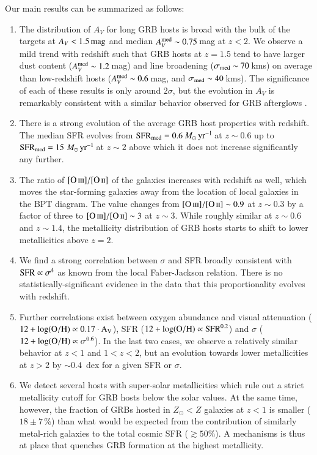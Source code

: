 \documentclass[traditabstract, longauth]{aa}
\newcommand{\oh}{12+\log(\rm{O/H})}
\newcommand{\oii}{[\ion{O}{ii}]}
\newcommand{\oiii}{[\ion{O}{iii}]}
\newcommand{\Msunyr}{$M_\odot\,\rm{yr}^{-1}$}
\begin{document}
Our main results can be summarized as follows:
\begin{enumerate}
\item The distribution of $A_V$ for long GRB hosts is broad with the bulk of the targets at $A_V<1.5\,\rm{mag}$ and median $A_V^{\rm med} \sim 0.75$\,mag at $z<2$. We observe a mild trend with redshift such that GRB hosts at $z = 1.5$ tend to have larger dust content ($A_V^{\rm med} \sim 1.2$\,mag) and line broadening ($\sigma_{\rm{med}}\sim70$\,kms) on average than low-redshift hosts ($A_V^{\rm med} \sim 0.6$\,mag, and $\sigma_{\rm{med}}\sim40$\,kms). The significance of each of these results is only around $2\sigma$, but the evolution in $A_V$ is remarkably consistent with a similar behavior observed for GRB afterglows \citep{2013MNRAS.432.1231C}.
\item There is a strong evolution of the average GRB host properties with redshift. The median SFR evolves from $\rm{SFR_{med}} = 0.6$\,\Msunyr\,at $z\sim0.6$ up to $\rm{SFR_{med}} = 15$\,\Msunyr\,at $z\sim2$ above which it does not increase significantly any further. 
\item The ratio of $\oiii/\oii$ of the galaxies increases with redshift as well, which moves the star-forming galaxies away from the location of local galaxies in the BPT diagram. The value changes from  $\oiii/\oii\sim0.9$ at $z\sim0.3$ by a factor of three to $\oiii/\oii\sim3$ at $z\sim3$. While roughly similar at $z\sim0.6$ and $z\sim1.4$, the metallicity distribution of GRB hosts starts to shift to lower metallicities above $z=2$.
\item We find a strong correlation between $\sigma$ and SFR broadly consistent with $\rm{SFR}\propto\sigma^4$ as known from the local Faber-Jackson relation. There is no statistically-significant evidence in the data that this proportionality evolves with redshift. 
\item Further correlations exist between oxygen abundance and visual attenuation ($\oh \propto 0.17\cdot A_V$), SFR  ($\oh \propto\mathrm{SFR}^{0.2}$) and $\sigma$ ($\oh \propto\sigma^{0.6}$). In the last two cases, we observe a relatively similar behavior at $z < 1$ and $1<z<2$, but an evolution towards lower metallicities at $z > 2$ by $\sim 0.4$~dex for a given SFR or $\sigma$.

\item We detect several hosts with super-solar metallicities which rule out a strict metallicity cutoff for GRB hosts below the solar values. At the same time, however, the fraction of GRBs hosted in $Z_{\odot} < Z$ galaxies at $z<1$ is smaller ($18\pm7\,\%$) than what would be expected from the contribution of similarly metal-rich galaxies to the total cosmic SFR ($\gtrsim 50\%$). A mechanisms is thus at place that quenches GRB formation at the highest metallicity. 
\end{enumerate}
\end{document}
